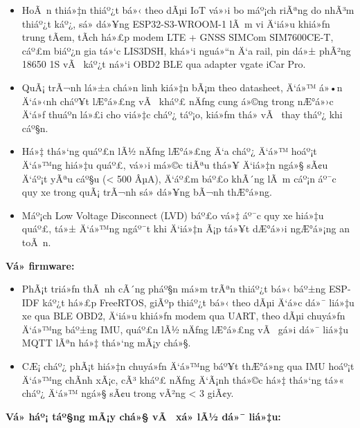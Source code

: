 \documentclass[a4paper]{extarticle}
\providecommand{\tightlist}{%
  \setlength{\itemsep}{0pt}\setlength{\parskip}{0pt}}
\begin{document}
\begin{itemize}
\tightlist
\item
  HoÃ n thiá»‡n thiáº¿t bá»‹ theo dÃµi IoT vá»›i bo máº¡ch riÃªng do nhÃ³m thiáº¿t káº¿, sá»­
  dá»¥ng ESP32-S3-WROOM-1 lÃ m vi Ä‘iá»u khiá»ƒn trung tÃ¢m, tÃ­ch há»£p modem LTE
  + GNSS SIMCom SIM7600CE-T, cáº£m biáº¿n gia tá»‘c LIS3DSH, khá»‘i nguá»“n Ä‘a
  rail, pin dá»± phÃ²ng 18650 1S vÃ  káº¿t ná»‘i OBD2 BLE qua adapter vgate iCar
  Pro.
\item
  QuÃ¡ trÃ¬nh lá»±a chá»n linh kiá»‡n bÃ¡m theo datasheet, Ä‘á»™ á»•n Ä‘á»‹nh cháº¥t lÆ°á»£ng
  vÃ  kháº£ nÄƒng cung á»©ng trong nÆ°á»›c Ä‘á»ƒ thuáº­n lá»£i cho viá»‡c cháº¿ táº¡o, kiá»ƒm
  thá»­ vÃ  thay tháº¿ khi cáº§n.
\item
  Há»‡ thá»‘ng quáº£n lÃ½ nÄƒng lÆ°á»£ng Ä‘a cháº¿ Ä‘á»™ hoáº¡t Ä‘á»™ng hiá»‡u quáº£, vá»›i má»©c tiÃªu
  thá»¥ Ä‘iá»‡n ngá»§ sÃ¢u Ä‘áº¡t yÃªu cáº§u (\textless{} 500 ÂµA), Ä‘áº£m báº£o khÃ´ng lÃ m
  cáº¡n áº¯c quy xe trong quÃ¡ trÃ¬nh sá»­ dá»¥ng bÃ¬nh thÆ°á»ng.
\item
  Máº¡ch Low Voltage Disconnect (LVD) báº£o vá»‡ áº¯c quy xe hiá»‡u quáº£, tá»± Ä‘á»™ng
  ngáº¯t khi Ä‘iá»‡n Ã¡p tá»¥t dÆ°á»›i ngÆ°á»¡ng an toÃ n.
\end{itemize}

\textbf{Vá» firmware:}

\begin{itemize}
\tightlist
\item
  PhÃ¡t triá»ƒn thÃ nh cÃ´ng pháº§n má»m trÃªn thiáº¿t bá»‹ báº±ng ESP-IDF káº¿t há»£p
  FreeRTOS, giÃºp thiáº¿t bá»‹ theo dÃµi Ä‘á»c dá»¯ liá»‡u xe qua BLE OBD2, Ä‘iá»u khiá»ƒn modem
  qua UART, theo dÃµi chuyá»ƒn Ä‘á»™ng báº±ng IMU, quáº£n lÃ½ nÄƒng lÆ°á»£ng vÃ  gá»­i dá»¯
  liá»‡u MQTT lÃªn há»‡ thá»‘ng mÃ¡y chá»§.
\item
  CÆ¡ cháº¿ phÃ¡t hiá»‡n chuyá»ƒn Ä‘á»™ng báº¥t thÆ°á»ng qua IMU hoáº¡t Ä‘á»™ng chÃ­nh xÃ¡c,
  cÃ³ kháº£ nÄƒng Ä‘Ã¡nh thá»©c há»‡ thá»‘ng tá»« cháº¿ Ä‘á»™ ngá»§ sÃ¢u trong vÃ²ng
  \textless{} 3 giÃ¢y.
\end{itemize}

\textbf{Vá» háº¡ táº§ng mÃ¡y chá»§ vÃ  xá»­ lÃ½ dá»¯ liá»‡u:}
\end{document}
